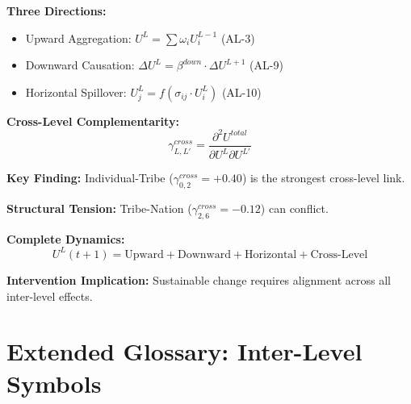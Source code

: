 \begin{tcolorbox}[colback=gray!5!white, colframe=gray!75!black, title=Inter-Level Dynamics Summary]

\textbf{Three Directions:}
\begin{itemize}
\item Upward Aggregation: $U^L = \sum \omega_i U^{L-1}_i$ (AL-3)
\item Downward Causation: $\Delta U^L = \beta^{down} \cdot \Delta U^{L+1}$ (AL-9)
\item Horizontal Spillover: $U^L_j = f(\sigma_{ij} \cdot U^L_i)$ (AL-10)
\end{itemize}

\textbf{Cross-Level Complementarity:}
$$\gamma^{cross}_{L,L'} = \frac{\partial^2 U^{total}}{\partial U^L \partial U^{L'}}$$

\textbf{Key Finding:}
Individual-Tribe ($\gamma^{cross}_{0,2} = +0.40$) is the strongest cross-level link.

\textbf{Structural Tension:}
Tribe-Nation ($\gamma^{cross}_{2,6} = -0.12$) can conflict.

\textbf{Complete Dynamics:}
$$U^L(t+1) = \text{Upward} + \text{Downward} + \text{Horizontal} + \text{Cross-Level}$$

\textbf{Intervention Implication:}
Sustainable change requires alignment across all inter-level effects.

\end{tcolorbox}

\section{Extended Glossary: Inter-Level Symbols}
\label{sec:aaa-extended-glossary}


